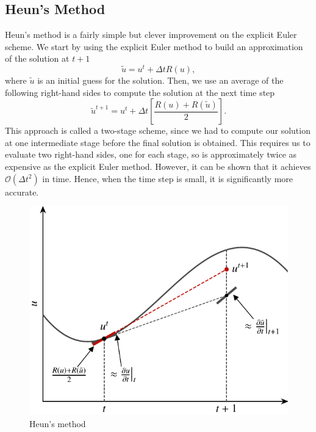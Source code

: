 \subsection{Heun's Method}
Heun's method is a fairly simple but clever improvement on the explicit Euler scheme. We start by using the explicit Euler method to build an approximation of the solution at $t+1$
\begin{equation}
	\tilde{u} = u^t + \Delta t R(u),
\end{equation}
where $\tilde{u}$ is an initial guess for the solution. Then, we use an average of the following right-hand sides to compute the solution at the next time step
\begin{equation}
	\tilde{u}^{t+1} = u^t + \Delta t \left[\frac{R(u) + R(\tilde{u})}{2} \right].
\end{equation}
This approach is called a two-stage scheme, since we had to compute our solution at one intermediate stage before the final solution is obtained. This requires us to evaluate two right-hand sides, one for each stage, so is approximately twice as expensive as the explicit Euler method. However, it can be shown that it achieves $\mathcal{O}(\Delta t^2)$ in time. Hence, when the time step is small, it is significantly more accurate.
\begin{figure}[htbp]
	\centering
	\includegraphics[width=0.6\linewidth]{Pictures/heuns_method}
	\caption{Heun's method}
	\label{fig:heuns_method}
\end{figure}

